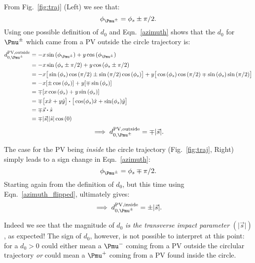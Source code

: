 From Fig.~\ref{fig:traj} (Left) we see that:
\begin{equation}
    \label{azimuth}
\phi_{\Pmu^{\pm}} = \phi_{s} \pm \pi/2.
\end{equation}
Using one possible definition of $d_{0}$ and Eqn.~\ref{azimuth} shows that 
the $d_0$ for $\Pmu^{\pm}$ which came from a PV outside the circle trajectory is:
\begin{align*}
    d_{0,\Pmu^{\pm}}^{\text{PV,outside}} &= -x \sin{( \phi_{\Pmu^{\pm}} )}  + y \cos{( \phi_{\Pmu^{\pm}} )} \\
    &= - x \sin{( \phi_s \pm \pi/2 )} + y \cos{( \phi_s \pm \pi/2 )}  \\
    &= -x \big[ \sin{(\phi_s)} \cos{(\pi/2)}  \pm \sin{(\pi/2)} \cos{(\phi_s)} \big]  
       + y \big[\cos{(\phi_s)} \cos{(\pi/2)} \mp \sin{(\phi_s)} \sin{(\pi/2)} \big] \\
    &= - x [\pm \cos{(\phi_s)}] + y [\mp \sin{(\phi_s)}] \\
    &= \mp [x \cos{(\phi_s)}  + y \sin{(\phi_s)}] \\
    &= \mp \big[ x \hat{x} + y \hat{y}  \big] \boldsymbol{\cdot} \big[ \cos(\phi_{s}) \hat{x} + \sin(\phi_{s}) \hat{y}  \big] \\
    &= \mp \vec{s} \boldsymbol{\cdot} \hat{s} \\
    &= \mp \lvert \vec{s} \rvert   \lvert \hat{s} \rvert    \cos{(0)}
\end{align*}
\begin{equation}
    \label{eqn:d0_out}
    \implies  d_{0,\Pmu^{\pm}}^{\text{PV,outside}} = \mp \lvert \vec{s} \rvert. 
\end{equation}

The case for the PV being {\it inside} the circle trajectory (Fig.~\ref{fig:traj}, Right) simply leads to a sign change in Eqn.~\ref{azimuth}:
\begin{equation}
    \label{azimuth_flipped}
\phi_{\Pmu^{\pm}} = \phi_{s} \mp \pi/2.
\end{equation}
Starting again from the definition of $d_0$, but this time using Eqn.~\ref{azimuth_flipped}, ultimately gives:
\begin{equation}
    \label{eqn:d0_in}
\implies  d_{0,\Pmu^{\pm}}^{\text{PV,inside}} = \pm \lvert \vec{s} \rvert.
\end{equation}

Indeed we see that the magnitude of $d_0$ {\it is the transverse impact parameter} $(\lvert \vec{s} \rvert)$, as expected!
The sign of $d_0$, however, is not possible to interpret at this point: 
for a $d_0 > 0$ could either mean a $\Pmu^-$ coming from a PV outside the circlular trajectory \emph{or}
could mean a $\Pmu^+$ coming from a PV found inside the circle.

